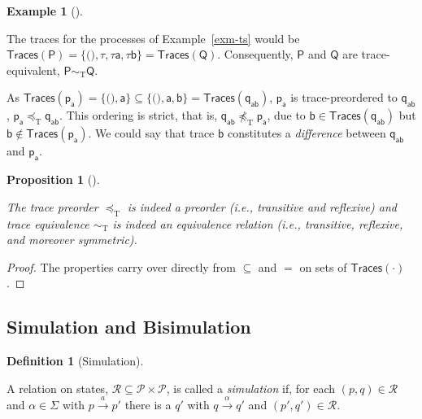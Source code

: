 \documentclass[
  a4paper,
]{report}
\theoremstyle{plain}
\newtheorem{proposition}{Proposition}[section]
\theoremstyle{plain}
\theoremstyle{definition}
\newtheorem{definition}{Definition}[section]
\theoremstyle{plain}
\theoremstyle{definition}
\newtheorem{example}{Example}[section]
\theoremstyle{remark}
\begin{document}
\begin{example}[]\protect\hypertarget{exm-phil-traces}{}\label{exm-phil-traces}

The traces for the processes of Example~\ref{exm-ts} would be
\(\mathsf{Traces}(\mathsf{P}) = \{\texttt{()}, τ, τ\mathsf{a}, τ\mathsf{b}\} = \mathsf{Traces}(\mathsf{Q})\).
Consequently, \(\mathsf{P}\) and \(\mathsf{Q}\) are trace-equivalent,
\(\mathsf{P} \sim_\mathrm{T} \mathsf{Q}\).

As
\(\mathsf{Traces}(\mathsf{p_a}) = \{\texttt{()}, \mathsf{a}\} ⊆ \{\texttt{()}, \mathsf{a}, \mathsf{b}\} = \mathsf{Traces}(\mathsf{q_{ab}})\),
\(\mathsf{p_a}\) is trace-preordered to \(\mathsf{q_{ab}}\),
\(\mathsf{p_a} \preceq_\mathrm{T} \mathsf{q_{ab}}\). This ordering is
strict, that is,
\(\mathsf{q_{ab}} \not\preceq_\mathrm{T} \mathsf{p_a}\), due to
\(\mathsf{b} ∈ \mathsf{Traces}(\mathsf{q_{ab}})\) but
\(\mathsf{b} \notin \mathsf{Traces}(\mathsf{p_a})\). We could say that
trace \(\mathsf{b}\) constitutes a \emph{difference} between
\(\mathsf{q_{ab}}\) and \(\mathsf{p_a}\).

\end{example}

\begin{proposition}[]\protect\hypertarget{prp-trace-eq-rel}{}\label{prp-trace-eq-rel}

The trace preorder \(\preceq_\mathrm{T}\) is indeed a preorder (i.e.,
transitive and reflexive) and trace equivalence \(\sim_\mathrm{T}\) is
indeed an equivalence relation (i.e., transitive, reflexive, and
moreover symmetric).

\end{proposition}

\begin{proof}
The properties carry over directly from \(⊆\) and \(=\) on sets of
\(\mathsf{Traces}(\cdot)\).
\end{proof}

\subsection{Simulation and
Bisimulation}\label{simulation-and-bisimulation}

\begin{definition}[Simulation]\protect\hypertarget{def-simulation}{}\label{def-simulation}

A relation on states, \(\mathcal{R} ⊆ \mathcal{P}× \mathcal{P}\), is
called a \emph{simulation} if, for each \((p, q) ∈ \mathcal{R}\) and
\(α ∈ \Sigma\) with \(p \xrightarrow{a} p'\) there is a \(q'\) with
\(q \xrightarrow{α} q'\) and \((p', q') ∈ \mathcal{R}\).

\end{definition}
\end{document}
